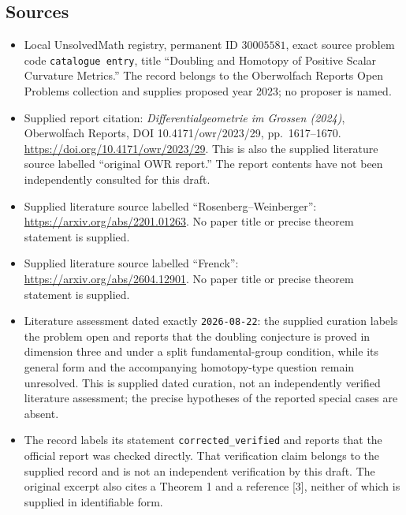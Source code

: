 \documentclass[11pt]{article}
\begin{document}
\subsection{Sources}
\begin{itemize}
\item Local UnsolvedMath registry, permanent ID \(30005581\), exact source problem code \texttt{catalogue entry}, title ``Doubling and Homotopy of Positive Scalar Curvature Metrics.'' The record belongs to the Oberwolfach Reports Open Problems collection and supplies proposed year 2023; no proposer is named.
\item Supplied report citation: \emph{Differentialgeometrie im Grossen (2024)}, Oberwolfach Reports, DOI 10.4171/owr/2023/29, pp.\ 1617--1670. \url{https://doi.org/10.4171/owr/2023/29}. This is also the supplied literature source labelled ``original OWR report.'' The report contents have not been independently consulted for this draft.
\item Supplied literature source labelled ``Rosenberg--Weinberger'': \url{https://arxiv.org/abs/2201.01263}. No paper title or precise theorem statement is supplied.
\item Supplied literature source labelled ``Frenck'': \url{https://arxiv.org/abs/2604.12901}. No paper title or precise theorem statement is supplied.
\item Literature assessment dated exactly \texttt{2026-08-22}: the supplied curation labels the problem open and reports that the doubling conjecture is proved in dimension three and under a split fundamental-group condition, while its general form and the accompanying homotopy-type question remain unresolved. This is supplied dated curation, not an independently verified literature assessment; the precise hypotheses of the reported special cases are absent.
\item The record labels its statement \texttt{corrected\_verified} and reports that the official report was checked directly. That verification claim belongs to the supplied record and is not an independent verification by this draft. The original excerpt also cites a Theorem 1 and a reference [3], neither of which is supplied in identifiable form.
\end{itemize}
\end{document}
